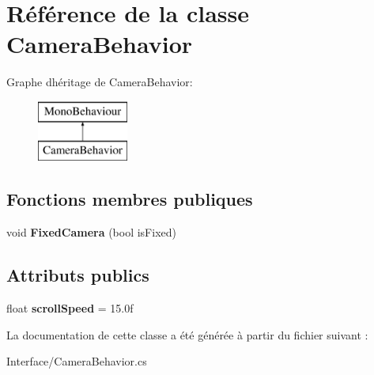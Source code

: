\hypertarget{class_camera_behavior}{}\section{Référence de la classe Camera\+Behavior}
\label{class_camera_behavior}
Graphe d\textquotesingle{}héritage de Camera\+Behavior\+:\begin{figure}[H]
\begin{center}
\leavevmode
\includegraphics[height=2.000000cm]{class_camera_behavior}
\end{center}
\end{figure}
\subsection*{Fonctions membres publiques}
\begin{DoxyCompactItemize}
\item 
\mbox{\label{class_camera_behavior_a9726b2f987d9b7b302a04edb5340a5fc}} 
void {\bfseries Fixed\+Camera} (bool is\+Fixed)
\end{DoxyCompactItemize}
\subsection*{Attributs publics}
\begin{DoxyCompactItemize}
\item 
\mbox{\label{class_camera_behavior_aa519801079199f95d58fe9da626a8011}} 
float {\bfseries scroll\+Speed} = 15.\+0f
\end{DoxyCompactItemize}


La documentation de cette classe a été générée à partir du fichier suivant \+:\begin{DoxyCompactItemize}
\item 
Interface/Camera\+Behavior.\+cs\end{DoxyCompactItemize}
